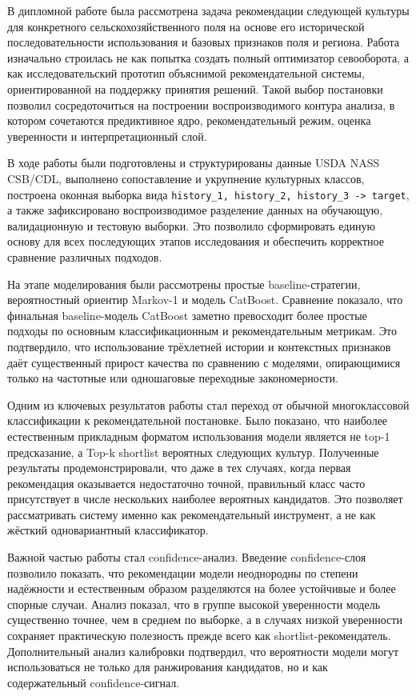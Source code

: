 
В дипломной работе была рассмотрена задача рекомендации следующей культуры для конкретного сельскохозяйственного поля на основе его исторической последовательности использования и базовых признаков поля и региона. Работа изначально строилась не как попытка создать полный оптимизатор севооборота, а как исследовательский прототип объяснимой рекомендательной системы, ориентированной на поддержку принятия решений. Такой выбор постановки позволил сосредоточиться на построении воспроизводимого контура анализа, в котором сочетаются предиктивное ядро, рекомендательный режим, оценка уверенности и интерпретационный слой.

В ходе работы были подготовлены и структурированы данные USDA NASS CSB/CDL, выполнено сопоставление и укрупнение культурных классов, построена оконная выборка вида \texttt{history\_1,\ history\_2,\ history\_3\ -\textgreater{}\ target}, а также зафиксировано воспроизводимое разделение данных на обучающую, валидационную и тестовую выборки. Это позволило сформировать единую основу для всех последующих этапов исследования и обеспечить корректное сравнение различных подходов.

На этапе моделирования были рассмотрены простые baseline-стратегии, вероятностный ориентир Markov-1 и модель CatBoost. Сравнение показало, что финальная baseline-модель CatBoost заметно превосходит более простые подходы по основным классификационным и рекомендательным метрикам. Это подтвердило, что использование трёхлетней истории и контекстных признаков даёт существенный прирост качества по сравнению с моделями, опирающимися только на частотные или одношаговые переходные закономерности.

Одним из ключевых результатов работы стал переход от обычной многоклассовой классификации к рекомендательной постановке. Было показано, что наиболее естественным прикладным форматом использования модели является не top-1 предсказание, а Top-k shortlist вероятных следующих культур. Полученные результаты продемонстрировали, что даже в тех случаях, когда первая рекомендация оказывается недостаточно точной, правильный класс часто присутствует в числе нескольких наиболее вероятных кандидатов. Это позволяет рассматривать систему именно как рекомендательный инструмент, а не как жёсткий одновариантный классификатор.

Важной частью работы стал confidence-анализ. Введение confidence-слоя позволило показать, что рекомендации модели неоднородны по степени надёжности и естественным образом разделяются на более устойчивые и более спорные случаи. Анализ показал, что в группе высокой уверенности модель существенно точнее, чем в среднем по выборке, а в случаях низкой уверенности сохраняет практическую полезность прежде всего как shortlist-рекомендатель. Дополнительный анализ калибровки подтвердил, что вероятности модели могут использоваться не только для ранжирования кандидатов, но и как содержательный confidence-сигнал.

